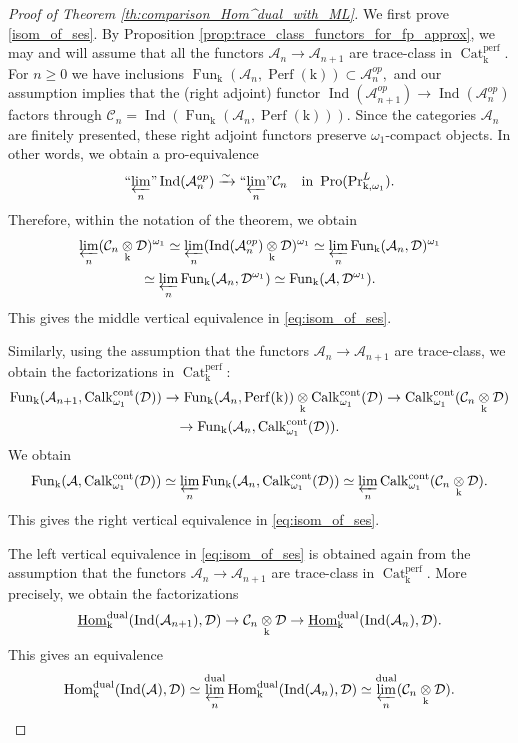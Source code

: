 \documentclass[11pt,leqno]{amsart}
\numberwithin{equation}{section}
\def\Hom{\operatorname{Hom}}
\newcommand{\tens}[1]{%
  \mathbin{\mathop{\otimes}\displaylimits_{#1}}%
}
\newcommand{\prolim}[1][]{\mathop{\varprojlim}\limits_{#1}}
\newcommand{\proolim}[1][]{{``{\prolim[#1]}"}}
\newcommand{\xto}{\xrightarrow}
\newcommand{\Cat}{\operatorname{Cat}}
\newcommand{\cont}{\operatorname{cont}}
\newcommand{\Prr}{\operatorname{Pr}}
\newcommand{\dual}{\operatorname{dual}}
\newcommand{\mk}{\mathrm k}
\newcommand{\cD}{{\mathcal D}}
\newcommand{\cA}{{\mathcal A}}
\newcommand{\cC}{{\mathcal C}}
\newcommand{\un}{\underline}
\newcommand{\Fun}{\operatorname{Fun}}
\newcommand{\Perf}{\operatorname{Perf}}
\newcommand{\perf}{\operatorname{perf}}
\newcommand{\Ind}{\operatorname{Ind}}
\newcommand{\Pro}{\operatorname{Pro}}
\newcommand{\Calk}{\operatorname{Calk}}
\begin{document}
\begin{proof}[Proof of Theorem \ref{th:comparison_Hom^dual_with_ML}] 
We first prove \ref{isom_of_ses}. By Proposition \ref{prop:trace_class_functors_for_fp_approx}, we may and will assume that all the functors $\cA_n\to\cA_{n+1}$ are trace-class in $\Cat^{\perf}_{\mk}.$ For $n\geq 0$ we have inclusions $\Fun_{\mk}(\cA_n,\Perf(\mk))\subset\cA_n^{op},$ and our assumption implies that the (right adjoint) functor $\Ind(\cA_{n+1}^{op})\to \Ind(\cA_n^{op})$ factors through $\cC_n=\Ind(\Fun_{\mk}(\cA_n,\Perf(\mk))).$ Since the categories $\cA_n$ are finitely presented, these right adjoint functors preserve $\omega_1$-compact objects. In other words, we obtain a pro-equivalence
\begin{equation}\label{eq:pro_equivalence_Pr^L}
\proolim[n]\Ind(\cA_n^{op})\xto{\sim} \proolim[n]\cC_n\quad \text{in }\Pro(\Prr^L_{\mk,\omega_1}).
\end{equation} 
Therefore, within the notation of the theorem, we obtain
\begin{multline*}
\prolim[n](\cC_n\tens{\mk}\cD)^{\omega_1}\simeq\prolim[n](\Ind(\cA_n^{op})\tens{\mk}\cD)^{\omega_1}\simeq \prolim[n]\Fun_{\mk}(\cA_n,\cD)^{\omega_1}\\
\simeq\prolim[n]\Fun_{\mk}(\cA_n,\cD^{\omega_1})\simeq \Fun_{\mk}(\cA,\cD^{\omega_1}).
\end{multline*}
This gives the middle vertical equivalence in \eqref{eq:isom_of_ses}.

Similarly, using the assumption that the functors $\cA_n\to\cA_{n+1}$ are trace-class, we obtain the factorizations in $\Cat_{\mk}^{\perf}:$
\begin{multline*}
\Fun_{\mk}(\cA_{n+1},\Calk_{\omega_1}^{\cont}(\cD))\to \Fun_{\mk}(\cA_n,\Perf(\mk))\tens{\mk} \Calk_{\omega_1}^{\cont}(\cD)\to \Calk_{\omega_1}^{\cont}(\cC_n\tens{\mk}\cD)\\
\to \Fun_{\mk}(\cA_n,\Calk_{\omega_1}^{\cont}(\cD)).
\end{multline*}
We obtain
\begin{equation*}
\Fun_{\mk}(\cA,\Calk_{\omega_1}^{\cont}(\cD))\simeq \prolim[n]\Fun_{\mk}(\cA_n,\Calk_{\omega_1}^{\cont}(\cD))\simeq\prolim[n]\Calk_{\omega_1}^{\cont}(\cC_n\tens{\mk}\cD).
\end{equation*}
This gives the right vertical equivalence in \eqref{eq:isom_of_ses}.

The left vertical equivalence in \eqref{eq:isom_of_ses} is obtained again from the assumption that the functors $\cA_n\to\cA_{n+1}$ are trace-class in $\Cat_{\mk}^{\perf}.$ More precisely, we obtain the factorizations
\begin{equation*}
\un{\Hom}_{\mk}^{\dual}(\Ind(\cA_{n+1}),\cD)\to \cC_n\tens{\mk}\cD\to \un{\Hom}_{\mk}^{\dual}(\Ind(\cA_n),\cD).
\end{equation*}
This gives an equivalence
\begin{equation*}
\Hom_{\mk}^{\dual}(\Ind(\cA),\cD)\simeq \prolim[n]^{\dual}\Hom_{\mk}^{\dual}(\Ind(\cA_n),\cD)\simeq \prolim[n]^{\dual}(\cC_n\tens{\mk}\cD).
\end{equation*}


\end{proof}
\end{document}
